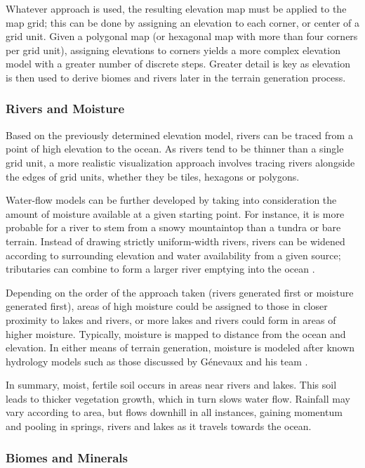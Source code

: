 Whatever approach is used, the resulting elevation map must be applied to the map grid; this can be done by assigning an elevation to each corner, or center of a grid unit. Given a polygonal map (or hexagonal map with more than four corners per grid unit), assigning elevations to corners yields a more complex elevation model with a greater number of discrete steps. Greater detail is key as elevation is then used to derive biomes and rivers later in the terrain generation process. 

\subsubsection{Rivers and Moisture}
Based on the previously determined elevation model, rivers can be traced from a point of high elevation to the ocean. As rivers tend to be thinner than a single grid unit, a more realistic visualization approach involves tracing rivers alongside the edges of grid units, whether they be tiles, hexagons or polygons. 

Water-flow models can be further developed by taking into consideration the amount of moisture available at a given starting point. For instance, it is more probable for a river to stem from a snowy mountaintop than a tundra or bare terrain. Instead of drawing strictly uniform-width rivers, rivers can be widened according to surrounding elevation and water availability from a given source; tributaries can combine to form a larger river emptying into the ocean \cite{Genevaux:2013:TGU:2461912.2461996}.

Depending on the order of the approach taken (rivers generated first or moisture generated first), areas of high moisture could be assigned to those in closer proximity to lakes and rivers, or more lakes and rivers could form in areas of higher moisture. Typically, moisture is mapped to distance from the ocean and elevation. In either means of terrain generation, moisture is modeled after known hydrology models such as those discussed by G\'enevaux and his team \cite{Genevaux:2013:TGU:2461912.2461996}. 

In summary, moist, fertile soil occurs in areas near rivers and lakes. This soil leads to thicker vegetation growth, which in turn slows water flow. Rainfall may vary according to area, but flows downhill in all instances, gaining momentum and pooling in springs, rivers and lakes as it travels towards the ocean.

\subsubsection{Biomes and Minerals}

